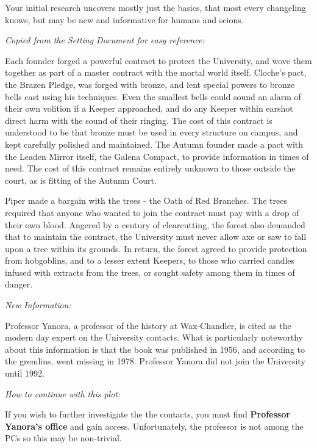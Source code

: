 \documentclass[green]{gl2018}
\begin{document}
\name{\gThreeContractsStart{}}



Your initial research uncovers mostly just the basics, that most every changeling knows, but may be new and informative for humans and scions.

\emph{Copied from the Setting Document for easy reference:}
\begin{changemargin}{3cm}{3cm}
Each founder forged a powerful contract to protect the University, and wove them together as part of a master contract with the mortal world itself. Cloche’s pact, the Brazen Pledge, was forged with bronze, and lent special powers to bronze bells cast using his techniques. Even the smallest bells could sound an alarm of their own volition if a Keeper approached, and do any Keeper within earshot direct harm with the sound of their ringing. The cost of this contract is understood to be that bronze must be used in every structure on campus, and kept carefully polished and maintained. The Autumn founder made a pact with the Leaden Mirror itself, the Galena Compact, to provide information in times of need. The cost of this contract remains entirely unknown to those outside the court, as is fitting of the Autumn Court.

Piper made a bargain with the trees - the Oath of Red Branches. The trees required that anyone who wanted to join the contract must pay with a drop of their own blood. Angered by a century of clearcutting, the forest also demanded that to maintain the contract, the University must never allow axe or saw to fall upon a tree within its grounds. In return, the forest agreed to provide protection from hobgoblins, and to a lesser extent Keepers, to those who carried candles infused with extracts from the trees, or sought safety among them in times of danger.
\end{changemargin}

\emph{New Information:}
\begin{changemargin}{3cm}{3cm}
Professor Yanora, a professor of the history at Wax-Chandler, is cited as the modern day expert on the University contacts. What is particularly noteworthy about this information is that the book was published in 1956, and according to the gremlins, went missing in 1978. Professor Yanora did not join the University until 1992.
\end{changemargin}

\emph{How to continue with this plot:}
\begin{changemargin}{3cm}{3cm}
If you wish to further investigate the the contacts, you must find {\bf Professor Yanora’s office} and gain access.  Unfortunately, the professor is not among the PCs so this may be non-trivial.
\end{changemargin}
\end{document}
